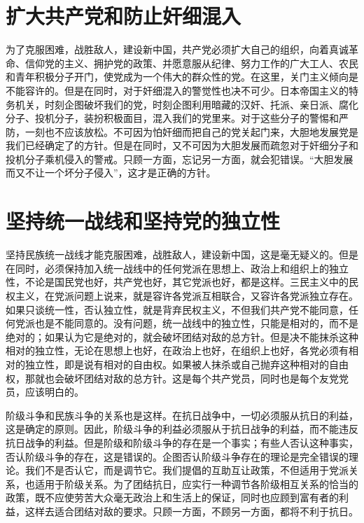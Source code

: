 \section{扩大共产党和防止奸细混入}

为了克服困难，战胜敌人，建设新中国，共产党必须扩大自己的组织，向着真诚革命、信仰党的主义、拥护党的政策、并愿意服从纪律、努力工作的广大工人、农民和青年积极分子开门，使党成为一个伟大的群众性的党。在这里，关门主义倾向是不能容许的。但是在同时，对于奸细混入的警觉性也决不可少。日本帝国主义的特务机关，时刻企图破坏我们的党，时刻企图利用暗藏的汉奸、托派、亲日派、腐化分子、投机分子，装扮积极面目，混入我们的党里来。对于这些分子的警惕和严防，一刻也不应该放松。不可因为怕奸细而把自己的党关起门来，大胆地发展党是我们已经确定了的方针。但是在同时，又不可因为大胆发展而疏忽对于奸细分子和投机分子乘机侵入的警戒。只顾一方面，忘记另一方面，就会犯错误。“大胆发展而又不让一个坏分子侵入”，这才是正确的方针。

\section{坚持统一战线和坚持党的独立性}

坚持民族统一战线才能克服困难，战胜敌人，建设新中国，这是毫无疑义的。但是在同时，必须保持加入统一战线中的任何党派在思想上、政治上和组织上的独立性，不论是国民党也好，共产党也好，其它党派也好，都是这样。三民主义中的民权主义，在党派问题上说来，就是容许各党派互相联合，又容许各党派独立存在。如果只谈统一性，否认独立性，就是背弃民权主义，不但我们共产党不能同意，任何党派也是不能同意的。没有问题，统一战线中的独立性，只能是相对的，而不是绝对的；如果认为它是绝对的，就会破坏团结对敌的总方针。但是决不能抹杀这种相对的独立性，无论在思想上也好，在政治上也好，在组织上也好，各党必须有相对的独立性，即是说有相对的自由权。如果被人抹杀或自己抛弃这种相对的自由权，那就也会破坏团结对敌的总方针。这是每个共产党员，同时也是每个友党党员，应该明白的。

阶级斗争和民族斗争的关系也是这样。在抗日战争中，一切必须服从抗日的利益，这是确定的原则。因此，阶级斗争的利益必须服从于抗日战争的利益，而不能违反抗日战争的利益。但是阶级和阶级斗争的存在是一个事实；有些人否认这种事实，否认阶级斗争的存在，这是错误的。企图否认阶级斗争存在的理论是完全错误的理论。我们不是否认它，而是调节它。我们提倡的互助互让政策，不但适用于党派关系，也适用于阶级关系。为了团结抗日，应实行一种调节各阶级相互关系的恰当的政策，既不应使劳苦大众毫无政治上和生活上的保证，同时也应顾到富有者的利益，这样去适合团结对敌的要求。只顾一方面，不顾另一方面，都将不利于抗日。

